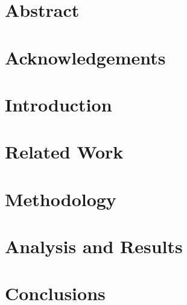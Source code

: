 \documentclass[12pt]{report}
\begin{document}

\chapter*{Abstract}
    
    
    
\chapter*{Acknowledgements}
    


\tableofcontents

    


\chapter{Introduction}
    

    
\chapter{Related Work}
    
    
    
\chapter{Methodology}
    
    

\chapter{Analysis and Results}
    
    
    
\chapter{Conclusions}
    


\appendix
    
    
    
\printbibliography %
    
\end{document}
